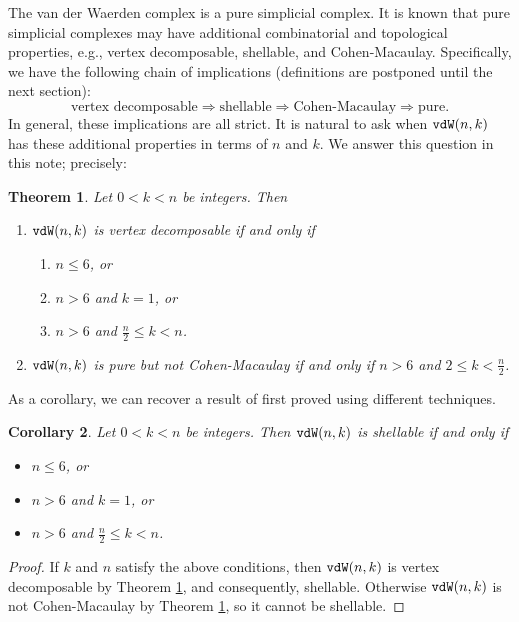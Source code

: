 \documentclass[12pt]{amsart}
\numberwithin{equation}{section}
\newtheorem{theorem}{Theorem}[section]
\newtheorem{corollary}[theorem]{Corollary}
\theoremstyle{definition}
\begin{document}
The van der Waerden complex is a pure simplicial complex.
It is known that pure simplicial complexes may have additional
combinatorial and topological properties, e.g., vertex
decomposable, shellable, and Cohen-Macaulay.  Specifically, we have
the following chain of implications (definitions are postponed
until the next section):
\[
\mbox{vertex decomposable} \Rightarrow
\mbox{shellable} \Rightarrow
\mbox{Cohen-Macaulay} \Rightarrow \mbox{pure}.\]
In general, these implications are all strict.  It is natural
to ask when ${\tt vdW}(n,k)$ has these additional
properties in terms of $n$ and $k$.    
We answer this question in this note; precisely:

\begin{theorem}\label{maintheorem}
Let  $0<k<n$ be integers.   Then 
\begin{enumerate}
\item[$(i)$] ${\tt vdW}(n,k)$ is vertex decomposable if and only if 
\begin{enumerate}
\item[$\bullet$] $n \leq 6$, or 
\item[$\bullet$] $n > 6$ and $k=1$, or
\item[$\bullet$] $n> 6$ and $\frac{n}{2} \leq k <n$.
\end{enumerate}
\item[$(ii)$] ${\tt vdW}(n,k)$ is pure but not Cohen-Macaulay  
if and only if $n > 6$ and $2 \leq k < \frac{n}{2}$.
\end{enumerate}
\end{theorem}

As a corollary, we can recover a result of \cite{H}
first proved using different techniques.

\begin{corollary}\label{maincor}
Let $0<k<n$ be integers.  Then ${\tt vdW}(n,k)$ is shellable if and only if
\begin{itemize}
\item $n\leq6$, or
\item $n>6$ and $k=1$, or
\item $n>6$ and $\frac{n}{2}\leq k<n$.
\end{itemize}
\end{corollary}

\begin{proof}
If $k$ and $n$ satisfy the above conditions, then 
${\tt vdW}(n,k)$ is vertex decomposable by Theorem \ref{maintheorem}, 
and consequently, shellable.  Otherwise
${\tt vdW}(n,k)$ is not Cohen-Macaulay by Theorem \ref{maintheorem}, 
so it cannot
be shellable.
\end{proof}
\end{document}
